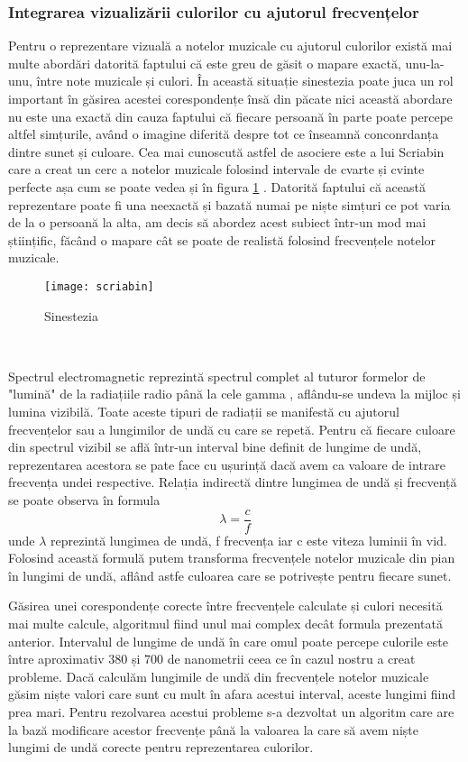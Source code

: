 \documentclass[../IoMusT.tex]{subfiles}
\begin{document}
\subsubsection{Integrarea vizualizării culorilor cu ajutorul frecvențelor}
Pentru o reprezentare vizuală a notelor muzicale cu ajutorul culorilor există mai multe abordări datorită faptului că este greu de găsit o mapare exactă, unu-la-unu, între note muzicale și culori. În această situație sinestezia poate juca un rol important în găsirea acestei corespondențe însă din păcate nici această abordare nu este una exactă din cauza faptului că fiecare persoană în parte poate percepe altfel simțurile, având o imagine diferită despre tot ce înseamnă conconrdanța dintre sunet și culoare. Cea mai cunoscută astfel de asociere este a lui Scriabin care a creat un cerc a notelor muzicale folosind intervale de cvarte și cvinte perfecte așa cum se poate vedea și în figura \ref{fig:scriabin} \cite{scriabin}. Datorită faptului că această reprezentare poate fi una neexactă și bazată numai pe niște simțuri ce pot varia de la o persoană la alta, am decis să abordez acest subiect într-un mod mai științific, făcând o mapare cât se poate de realistă folosind frecvențele notelor muzicale. 
\begin{figure}[h]
\centering
\texttt{[image: scriabin]}
\caption{Sinestezia}
\label{fig:scriabin}
\end{figure} 
\\
\par Spectrul electromagnetic reprezintă spectrul complet al tuturor formelor de "lumină" de la radiațiile radio până la cele gamma \cite{spectrum}, aflându-se undeva la mijloc și lumina vizibilă. Toate aceste tipuri de radiații se manifestă cu ajutorul frecvențelor sau a lungimilor de undă cu care se repetă. Pentru că fiecare culoare din spectrul vizibil se află într-un interval bine definit de lungime de undă, reprezentarea acestora se pate face cu ușurință dacă avem ca valoare de intrare frecvența undei respective. Relația indirectă dintre lungimea de undă și frecvență se poate observa în formula \[\lambda = \frac{c}{f}\] unde $\lambda$  reprezintă lungimea de undă, f frecvența iar c este viteza luminii în vid. Folosind această formulă putem transforma frecvențele notelor muzicale din pian în lungimi de undă, aflând astfe culoarea care se potrivește pentru fiecare sunet.
\\
\par Găsirea unei corespondențe corecte între frecvențele calculate și culori necesită mai multe calcule, algoritmul fiind unul mai complex decât formula prezentată anterior. Intervalul de lungime de undă în care omul poate percepe culorile este între aproximativ 380 și 700 de nanometrii ceea ce în cazul nostru a creat probleme. Dacă calculăm lungimile de undă din frecvențele notelor muzicale găsim niște valori care sunt cu mult în afara acestui interval, aceste lungimi fiind prea mari. Pentru rezolvarea acestui probleme s-a dezvoltat un algoritm care are la bază modificare acestor frecvențe până la valoarea la care să avem niște lungimi de undă corecte pentru reprezentarea culorilor.
\end{document}
